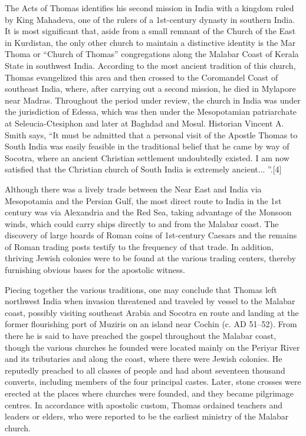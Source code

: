 \documentclass[12pt,letterpaper,twoside,final]{memoir}
\begin{document}
{The Acts of Thomas identifies his second mission in India with a kingdom ruled by King Mahadeva, one of the rulers of a 1st-century dynasty in southern India. It is most significant that, aside from a small remnant of the Church of the East in Kurdistan, the only other church to maintain a distinctive identity is the Mar Thoma or “Church of Thomas” congregations along the Malabar Coast of Kerala State in southwest India. According to the most ancient tradition of this church, Thomas evangelized this area and then crossed to the Coromandel Coast of southeast India, where, after carrying out a second mission, he died in Mylapore near Madras. Throughout the period under review, the church in India was under the jurisdiction of Edessa, which was then under the Mesopotamian patriarchate at Seleucia-Ctesiphon and later at Baghdad and Mosul. Historian Vincent A. Smith says, “It must be admitted that a personal visit of the Apostle Thomas to South India was easily feasible in the traditional belief that he came by way of Socotra, where an ancient Christian settlement undoubtedly existed. I am now satisfied that the Christian church of South India is extremely ancient... ”.[4]

Although there was a lively trade between the Near East and India via Mesopotamia and the Persian Gulf, the most direct route to India in the 1st century was via Alexandria and the Red Sea, taking advantage of the Monsoon winds, which could carry ships directly to and from the Malabar coast. The discovery of large hoards of Roman coins of 1st-century Caesars and the remains of Roman trading posts testify to the frequency of that trade. In addition, thriving Jewish colonies were to be found at the various trading centers, thereby furnishing obvious bases for the apostolic witness.

Piecing together the various traditions, one may conclude that Thomas left northwest India when invasion threatened and traveled by vessel to the Malabar coast, possibly visiting southeast Arabia and Socotra en route and landing at the former flourishing port of Muziris on an island near Cochin (c. AD 51–52). From there he is said to have preached the gospel throughout the Malabar coast, though the various churches he founded were located mainly on the Periyar River and its tributaries and along the coast, where there were Jewish colonies. He reputedly preached to all classes of people and had about seventeen thousand converts, including members of the four principal castes. Later, stone crosses were erected at the places where churches were founded, and they became pilgrimage centres. In accordance with apostolic custom, Thomas ordained teachers and leaders or elders, who were reported to be the earliest ministry of the Malabar church.}
\end{document}
